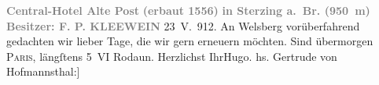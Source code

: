 \begin{ledgroupsized}[t]{13cm}
           \pstart
           \noindent{}\centering{}\textcolor{gray}{\textbf{{\pb}Central-Hotel Alte Post}}\pend
           \pstart
           \noindent{}\centering{}\textcolor{gray}{\textbf{(erbaut 1556)}}\pend
           \pstart
           \noindent{}\centering{}\textcolor{gray}{\textbf{in Sterzing a. Br.
                     (950 m)}}\pend
           \pstart
           \noindent{}\centering{}\textcolor{gray}{\textbf{Besitzer: F. P. KLEEWEIN}}\pend
           \pstart
           \raggedleft{}23 V. 912.\pend
           \pstart
           An Welsberg vorüberfahrend gedachten wir lieber
               Tage, die wir gern erneuern möchten. Sind übermorgen \textsc{Paris}, längſtens 5 VI{ }Rodaun.\pend
           \pstart Herzlichst Ihr\spacefill\mbox{Hugo.}\pend{}\pstart
           \noindent{}{[}hs. Gertrude von Hofmannsthal:{]} \label{T_L02070_1v}\label{T_L02070_1h}\pend
           
         
         \endnumbering{}\end{ledgroupsized}  \newcommand{\dateiname}{L02070}\newcommand{\titel}{Hugo und Gerty von Hofmannsthal an Arthur Schnitzler, 23. 5. 1912}\newcommand{\editorInnen}{Martin Anton Müller und Gerd-Hermann Susen}
      